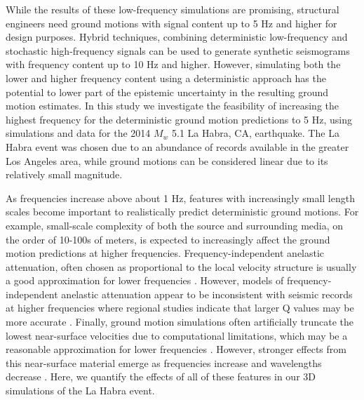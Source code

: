 While the results of these low-frequency simulations are promising, structural engineers need ground motions with signal content up to 5 Hz and higher for design purposes. Hybrid techniques, combining deterministic low-frequency and stochastic high-frequency signals  can be used to generate synthetic seismograms with frequency content up to 10 Hz and higher. However, simulating both the lower and higher frequency content using a deterministic approach has the potential to lower part of the epistemic uncertainty in the resulting ground motion estimates. In this study we investigate the feasibility of increasing the highest frequency for the deterministic ground motion predictions to 5 Hz, using simulations and data for the 2014 $M_w$ 5.1 La Habra, CA, earthquake. The La Habra event was chosen due to an abundance of records available in the greater Los Angeles area, while ground motions can be considered linear due to its relatively small magnitude.


As frequencies increase above about 1 Hz, features with increasingly small length scales become important to realistically predict deterministic ground motions. For example, small-scale complexity of both the source and surrounding media, on the order of 10-100s of meters, is expected to increasingly affect the ground motion predictions at higher frequencies. Frequency-independent anelastic attenuation, often chosen as proportional to the local velocity structure  is usually a good approximation for lower frequencies \citep[e.g., up to ~1 Hz][]{liu1976velocity,fehler1992separation}. However, models of frequency-independent anelastic attenuation appear to be inconsistent with seismic records at higher frequencies where regional studies indicate that larger Q values may be more accurate . Finally, ground motion simulations often artificially truncate the lowest near-surface velocities due to computational limitations, which may be a reasonable approximation for lower frequencies . However, stronger effects from this near-surface material emerge as frequencies increase and wavelengths decrease . Here, we quantify the effects of all of these features in our 3D simulations of the La Habra event.

